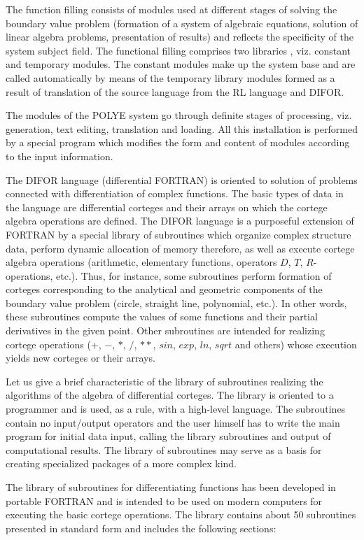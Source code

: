 The function filling consists of modules used at different stages of solving
the boundary value problem (formation of a system of algebraic equations,
solution of linear algebra problems, presentation of results) and reflects
the specificity of the system subject field. The functional filling
comprises two libraries , viz. constant and temporary modules. The constant
modules make up the system base and are called automatically by means of the
temporary library modules formed as a result of translation of the source
language from the RL language and DIFOR.

The modules of the POLYE system go through definite stages of processing,
viz. generation, text editing, translation and loading. All this
installation is performed by a special program which modifies the form and
content of modules according to the input information.

The DIFOR language (differential FORTRAN) is oriented to solution of
problems connected with differentiation of complex functions. The basic
types of data in the language are differential corteges and their arrays on
which the cortege algebra operations are defined. The DIFOR language is a
purposeful extension of FORTRAN by a special library of subroutines which
organize complex structure data, perform dynamic allocation of memory
therefore, as well as execute cortege algebra operations (arithmetic,
elementary functions, operators $D$, $T$, $R$-operations, etc.). Thus, for
instance, some subroutines perform formation of corteges corresponding to
the analytical and geometric components of the boundary value problem
(circle, straight line, polynomial, etc.). In other words, these subroutines
compute the values of some functions and their partial derivatives in the
given point. Other subroutines are intended for realizing cortege operations
($+$, $-$, $*$, $/$, $**$, $sin$, $exp$, $ln$, $sqrt$ and others) whose
execution yields new corteges or their arrays.

Let us give a brief characteristic of the library of subroutines realizing
the algorithms of the algebra of differential corteges. The library is
oriented to a programmer and is used, as a rule, with a high-level language.
The subroutines contain no input/output operators and the user himself has
to write the main program for initial data input, calling the library
subroutines and output of computational results. The library of subroutines
may serve as a basis for creating specialized packages of a more complex
kind.

The library of subroutines for differentiating functions has been developed
in portable FORTRAN and is intended to be used on modern computers for
executing the basic cortege operations. The library contains about 50
subroutines presented in standard form and includes the following sections:


